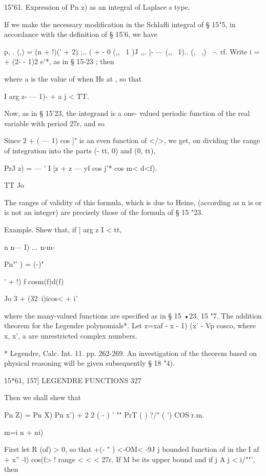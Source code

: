 {{{15"61. Expression of Pn z) as an integral of Laplace s type.

If we make the necessary modification in the Schlafli integral of §
15"5, in accordance with the definition of § 15'6, we have

p, . (,) = (n + !)(' + 2) ;.. ( + - 0 (,, \ 1 )J ,,. |- --- (,, \ 1)..
(, \ ,)\ \ -. rf. Write i = + (2- - 1)2 e'*, as in § 15-23 ; then

where a is the value of when Hs at , so that

I arg z- — 1)- + a j < TT.

Now, as in § 15'23, the integrand is a one- valued periodic function
of the real variable with period 27r, and so

Since 2 + ( — 1) cos ]" is an even function of </>, we get, on
dividing the range of integration into the parts (- tt, 0) and (0,
tt),

PrJ z) = — ' I [z + z — yf cos j'* cos m< d<f).

TT Jo

The ranges of validity of this formula, which is due to Heine,
(according as n is or is not an integer) are precisely those of the
formula of § 15 "23.

Example. Shew that, if | arg z I < tt,

n n— I) ... n-m-



Pn"' ) = (-)"



' + !) f cosm(f)d(f)

Jo 3 + (32\ i)icos< + i'



where the many-valued functions are specified as in § 15 •23. 15 "7.
The addition theorem for the Legendre polynomials*. Let z=xaf - x - 1)
(x' - Vp cosco, where x, x', a are unrestricted complex numbers.

* Legendre, Calc. Int. 11. pp. 262-269. An investigation of the
theorem based on physical reasoning will be given subsequently § 18
"4).



15*61, 157] LEGENDRE FUNCTIONS 327

Then we shall shew that

Pn Z) = Pn X) Pn x') + 2 2 ( - ) ' "" PrT ( ) ?/" ( ') COS r.m.

m=i n + ni) \

First let R (of) > 0, so that +(- " ) <-OM< -9J j bounded function of
in the I af + x'' -l) cos(f> ! range < < < 27r. If M be its upper
bound and if j A j < i/""', then

}}}
